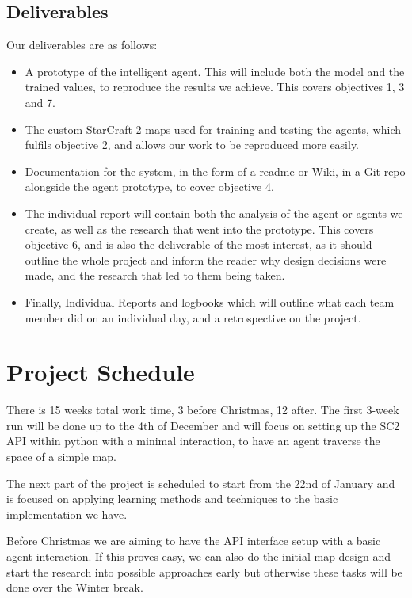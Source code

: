 \documentclass[12pt]{article}
\begin{document}
\subsection{Deliverables}
Our deliverables are as follows:
\begin{itemize}
    \item A prototype of the intelligent agent.
          This will include both the model and the trained values,
          to reproduce the results we achieve. This covers objectives 1, 3 and 7.
    \item The custom StarCraft 2 maps used for training and testing the agents,
          which fulfils objective 2, and allows our work to be reproduced more easily.
    \item Documentation for the system, in the form of a readme or Wiki,
          in a Git repo alongside the agent prototype, to cover objective 4.
    \item The individual report will contain both the analysis of the agent or
          agents we create, as well as the research that went into the prototype.
          This covers objective 6, and is also the deliverable of the most interest,
          as it should outline the whole project and inform the reader why design
          decisions were made, and the research that led to them being taken.
    \item Finally, Individual Reports and logbooks which will outline what each
          team member did on an individual day, and a retrospective on the project.
\end{itemize}

\section{Project Schedule}

There is 15 weeks total work time, 3 before Christmas, 12 after.
The first 3-week run will be done up to the 4th of December and will focus
on setting up the SC2 API within python with a minimal interaction, to
have an agent traverse the space of a simple map.

The next part of the project is scheduled to start from the 22nd of
January and is focused on applying learning methods and techniques
to the basic implementation we have.

Before Christmas we are aiming to have the API interface setup with
a basic agent interaction. If this proves easy, we can also do the
initial map design and start the research into possible approaches early
but otherwise these tasks will be done over the Winter break.
\end{document}
